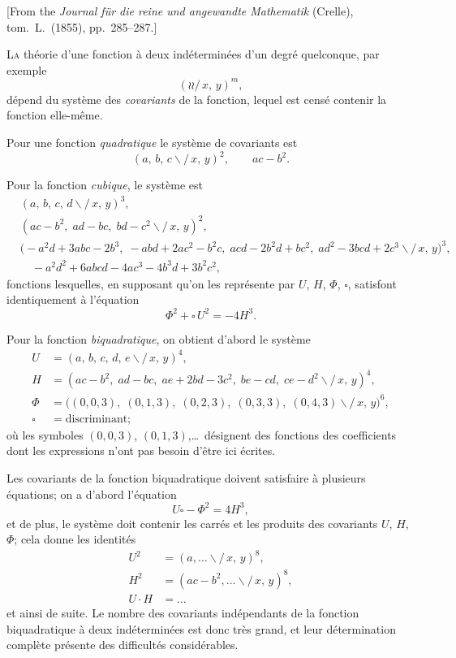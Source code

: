 \documentclass[11pt,a4paper]{article}
\theoremstyle{definition}
\begin{document}
[From the \textit{Journal f\"ur die reine und angewandte Mathematik} (Crelle),
tom.\ L.\ (1855), pp.\ 285--287.]

\medskip

\textsc{La} th\'eorie d'une fonction \`a deux ind\'etermin\'ees d'un degr\'e
quelconque, par exemple
\[
(\wr\wr\!\!\!/\,x,\, y)^m,
\]
d\'epend du syst\`eme des \textit{covariants} de la fonction, lequel est
cens\'e contenir la fonction elle-m\^eme.

Pour une fonction \textit{quadratique} le syst\`eme de covariants est
\[
(a,\, b,\, c\!\!\backslash\!\!\!/\,x,\, y)^2,\qquad ac-b^2.
\]

Pour la fonction \textit{cubique}, le syst\`eme est
\begin{align*}
&(a,\, b,\, c,\, d\!\!\backslash\!\!\!/\,x,\, y)^3, \\
&(ac-b^2,\; ad-bc,\; bd-c^2 \backslash\!\!\!/\,x,\, y)^2, \\
&\bigl(-a^2d + 3abc - 2b^3,\; -abd + 2ac^2 - b^2c,\;
acd - 2b^2d + bc^2,\; ad^2 - 3bcd + 2c^3 \backslash\!\!\!/\,x,\, y\bigr)^3, \\
&\quad -a^2d^2 + 6abcd - 4ac^3 - 4b^3d + 3b^2c^2,
\end{align*}
fonctions lesquelles, en supposant qu'on les repr\'esente par $U$, $H$,
$\Phi$, $\square$, satisfont identiquement \`a l'\'equation
\[
\Phi^2 + \square\,U^2 = -4H^3.
\]

Pour la fonction \textit{biquadratique}, on obtient d'abord le syst\`eme
\begin{align*}
U &= (a,\, b,\, c,\, d,\, e\!\!\backslash\!\!\!/\,x,\, y)^4, \\
H &= (ac-b^2,\; ad-bc,\; ae + 2bd - 3c^2,\; be-cd,\; ce-d^2
\backslash\!\!\!/\,x,\, y)^4, \\
\Phi &= \bigl( (0,0,3),\; (0,1,3),\; (0,2,3),\; (0,3,3),\;
(0,4,3) \backslash\!\!\!/\,x,\, y\bigr)^6, \\
\square &= \text{discriminant};
\end{align*}
o\`u les symboles $(0,0,3)$, $(0,1,3)$,\ldots\ d\'esignent des fonctions
des coefficients dont les expressions n'ont pas besoin d'\^etre ici
\'ecrites.

\medskip

Les covariants de la fonction biquadratique doivent satisfaire \`a
plusieurs \'equations; on a d'abord l'\'equation
\[
U\square - \Phi^2 = 4H^3,
\]
et de plus, le syst\`eme doit contenir les carr\'es et les produits des
covariants $U$, $H$, $\Phi$; cela donne les identit\'es
\begin{align*}
U^2 &= (a,\ldots \backslash\!\!\!/\,x,\, y)^8, \\
H^2 &= (ac-b^2,\ldots \backslash\!\!\!/\,x,\, y)^8, \\
U\cdot H &= \ldots
\end{align*}
et ainsi de suite. Le nombre des covariants ind\'ependants de la fonction
biquadratique \`a deux ind\'etermin\'ees est donc tr\`es grand, et leur
d\'etermination compl\`ete pr\'esente des difficult\'es consid\'erables.
\end{document}
